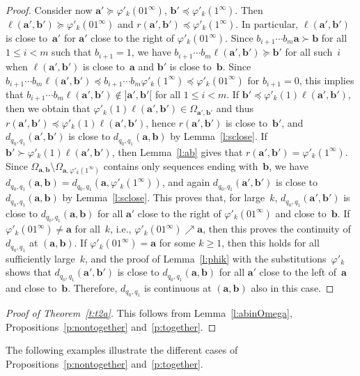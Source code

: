 \documentclass{amsart}
\theoremstyle{definition}
\numberwithin{equation}{section}
\newcommand{\ba}{\mathbf{a}}
\newcommand{\bb}{\mathbf{b}}
\begin{document}
\begin{proof}
Consider now $\ba' \succeq \varphi'_k(01^\infty)$, $\bb' \preceq \varphi'_k(1^\infty)$.
Then $\ell(\ba',\bb') \succeq \varphi'_k(01^\infty)$ and $r(\ba',\bb') \preceq \varphi'_k(1^\infty)$.
In particular, $\ell(\ba',\bb')$ is close to~$\ba'$ for $\ba'$ close to the right of $\varphi'_k(01^\infty)$.
Since $b_{i+1} \cdots b_m \ba \succ \bb$ for all $1 \le i < m$ such that $b_{i+1} = 1$, we have $b_{i+1} \cdots b_m \ell(\ba',\bb') \succeq \bb'$ for all such~$i$ when $\ell(\ba',\bb')$ is close to~$\ba$ and $\bb'$ is close to~$\bb$.
Since $b_{i+1} \cdots b_m \ell(\ba',\bb') \preceq b_{i+1} \cdots b_m \varphi'_k(1^\infty) \preceq \varphi'_k(01^\infty)$ for $b_{i+1} = 0$, this implies that $b_{i+1} \cdots b_m \ell(\ba',\bb') \notin {]\ba',\bb'[}$ for all $1 \le i < m$.
If $\bb' \preceq \varphi'_k(1) \ell(\ba',\bb')$, then we obtain that $\varphi'_k(1) \ell(\ba',\bb') \in \Omega_{\ba',\bb'}$ and thus $r(\ba',\bb') \preceq \varphi'_k(1) \ell(\ba',\bb')$, hence $r(\ba',\bb')$ is close to~$\bb'$, and $d_{q_0,q_1}(\ba',\bb')$ is close to $d_{q_0,q_1}(\ba,\bb)$ by Lemma~\ref{l:sclose}.
If $\bb' \succ \varphi'_k(1) \ell(\ba',\bb')$, then Lemma~\ref{l:ab} gives that $r(\ba',\bb') = \varphi'_k(1^\infty)$.
Since $\Omega_{\ba,\bb} \setminus \Omega_{\ba,\varphi'_k(1^\infty)}$ contains only sequences ending with~$\bb$, we have $d_{q_0,q_1}(\ba,\bb) = d_{q_0,q_1}(\ba,\varphi'_k(1^\infty))$, and again $d_{q_0,q_1}(\ba',\bb')$ is close to $d_{q_0,q_1}(\ba,\bb)$ by Lemma~\ref{l:sclose}.
This proves that, for large~$k$, $d_{q_0,q_1}(\ba',\bb')$ is close to $d_{q_0,q_1}(\ba,\bb)$ for all $\ba'$ close to the right of $\varphi'_k(01^\infty)$ and close to~$\bb$.
If $\varphi'_k(01^\infty) \ne \ba$ for all~$k$, i.e., $\varphi'_k(01^\infty) \nearrow \ba$, then this proves the continuity of $d_{q_0,q_1}$ at $(\ba,\bb)$.
If $\varphi'_k(01^\infty) = \ba$ for some $k \ge 1$, then this holds for all sufficiently large~$k$, and the proof of Lemma~\ref{l:phik} with the substitutions~$\varphi'_k$ shows that $d_{q_0,q_1}(\ba',\bb')$ is close to $d_{q_0,q_1}(\ba,\bb)$ for all $\ba'$ close to the left of~$\ba$ and close to~$\bb$.
Therefore, $d_{q_0,q_1}$ is continuous at $(\ba,\bb)$ also in this case.
\end{proof}

\begin{proof}[Proof of Theorem~\ref{t:t2a}]
This follows from Lemma~\ref{l:abinOmega}, Propositions~\ref{p:nontogether} and~\ref{p:together}.
\end{proof}

The following examples illustrate the different cases of Propositions~\ref{p:nontogether} and~\ref{p:together}.
\end{document}
